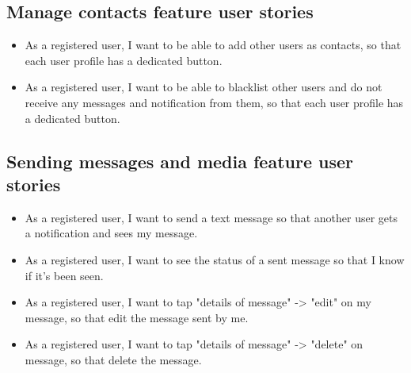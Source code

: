 \subsection{Manage contacts feature user stories}\label{subsec:manage-contacts-feature-user-stories}
\begin{itemize}
    \item As a registered user, I want to be able to add other users as contacts, so that each user profile has a dedicated button.
    \item As a registered user, I want to be able to blacklist other users and do not receive any messages and notification from them,
    so that each user profile has a dedicated button.
\end{itemize}

\subsection{Sending messages and media feature user stories}\label{subsec:sending-messages-and-media-feature-user-stories}
\begin{itemize}
    \item As a registered user, I want to send a text message so that another user gets a notification and sees my message.
    \item As a registered user, I want to see the status of a sent message so that I know if it’s been seen.
    \item As a registered user, I want to tap "details of message" -> "edit" on my message, so that edit the message sent by me.
    \item As a registered user, I want to tap "details of message" -> "delete" on message, so that delete the message.
\end{itemize}

